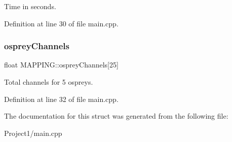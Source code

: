 Time in seconds. 



Definition at line 30 of file main.\+cpp.

\mbox{\label{struct_m_a_p_p_i_n_g_a61e51da6902d216a44246400c331c988}} 
\subsubsection{\texorpdfstring{osprey\+Channels}{ospreyChannels}}
{\footnotesize\ttfamily float M\+A\+P\+P\+I\+N\+G\+::osprey\+Channels\mbox{[}25\mbox{]}}



Total channels for 5 ospreys. 



Definition at line 32 of file main.\+cpp.



The documentation for this struct was generated from the following file\+:\begin{DoxyCompactItemize}
\item 
Project1/main.\+cpp\end{DoxyCompactItemize}
